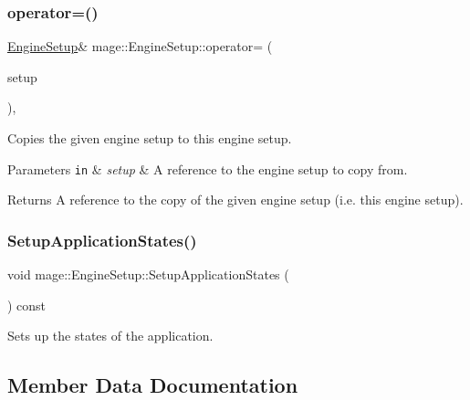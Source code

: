 \subsubsection{\texorpdfstring{operator=()}{operator=()}}
{\footnotesize\ttfamily \hyperlink{structmage_1_1_engine_setup}{Engine\+Setup}\& mage\+::\+Engine\+Setup\+::operator= (\begin{DoxyParamCaption}\item[{const \hyperlink{structmage_1_1_engine_setup}{Engine\+Setup} \&}]{setup }\end{DoxyParamCaption})\hspace{0.3cm}{\ttfamily [private]}, {\ttfamily [delete]}}

Copies the given engine setup to this engine setup.


\begin{DoxyParams}[1]{Parameters}
\mbox{\tt in}  & {\em setup} & A reference to the engine setup to copy from. \\
\hline
\end{DoxyParams}
\begin{DoxyReturn}{Returns}
A reference to the copy of the given engine setup (i.\+e. this engine setup). 
\end{DoxyReturn}
\hypertarget{structmage_1_1_engine_setup_ab95385739022f00e811b924c9bc0c031}{}\label{structmage_1_1_engine_setup_ab95385739022f00e811b924c9bc0c031} 
\subsubsection{\texorpdfstring{Setup\+Application\+States()}{SetupApplicationStates()}}
{\footnotesize\ttfamily void mage\+::\+Engine\+Setup\+::\+Setup\+Application\+States (\begin{DoxyParamCaption}{ }\end{DoxyParamCaption}) const}

Sets up the states of the application. 

\subsection{Member Data Documentation}
\hypertarget{structmage_1_1_engine_setup_af91461305cd9aa60e22fa770395d2238}{}\label{structmage_1_1_engine_setup_af91461305cd9aa60e22fa770395d2238} 
